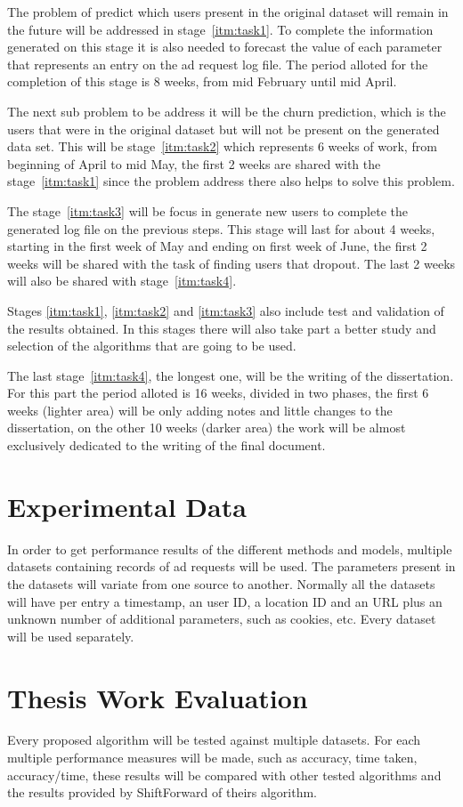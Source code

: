 The problem of predict which users present in the original dataset will remain
in the future will be addressed in stage~\ref{itm:task1}. To complete the
information generated on this stage it is also needed to forecast the value of
each parameter that represents an entry on the ad request log file. The period
alloted for the completion of this stage is 8 weeks, from mid February until mid
April.

The next sub problem to be address it will be the churn prediction, which is the
users that were in the original dataset but will not be present on the generated
data set. This will be stage~\ref{itm:task2} which represents 6 weeks of
work, from beginning of April to mid May,
the first 2 weeks are shared with the stage~\ref{itm:task1} since the problem
address there also helps to solve this problem.

The stage~\ref{itm:task3} will be focus in generate new users to complete the
generated log file on the previous steps. This stage will last for about 4
weeks, starting in the first week of May and ending on first week of June, the first 2
weeks will be shared with the task of finding users that dropout. The last 2
weeks will also be shared with stage~\ref{itm:task4}.

Stages \ref{itm:task1}, \ref{itm:task2} and \ref{itm:task3} also include test
and validation of the results obtained. In this stages there will also take part
a better study and selection of the algorithms that are going to be used.

The last stage~\ref{itm:task4}, the longest one, will be the writing of the
dissertation. For this part the period alloted is 16 weeks, divided in two
phases, the first 6 weeks (lighter area) will be only adding notes and little changes to the
dissertation, on the other 10 weeks (darker area) the work will be almost exclusively dedicated
to the writing of the final document.


\section{Experimental Data}

In order to get performance results of the different methods and models,
multiple datasets containing records of ad requests will be used. The parameters
present in the datasets will variate from one source to another. Normally all
the datasets will have per entry a timestamp, an user ID, a location ID and an
URL plus an unknown number of additional parameters, such as cookies, etc.
Every dataset will be used separately.

\section{Thesis Work Evaluation}

Every proposed algorithm will be tested against multiple datasets. For each
multiple performance measures will be made, such as accuracy, time taken,
accuracy/time, these results will be compared with other tested algorithms and
the results provided by ShiftForward of theirs algorithm.
